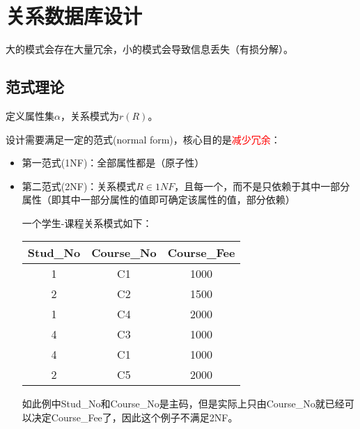 
\section{关系数据库设计} %
大的模式会存在大量冗余，小的模式会导致信息丢失（有损分解）。

\subsection{范式理论}
定义属性集$\alpha$，关系模式为$r(R)$。

设计需要满足一定的范式(normal form)，核心目的是\textcolor{red}{减少冗余}：
\begin{itemize}
	\item 第一范式(1NF)：全部属性都是（原子性）

	\item 第二范式(2NF)：关系模式$R\in 1NF$，且每一个，而不是只依赖于其中一部分属性（即其中一部分属性的值即可确定该属性的值，部分依赖）
	\begin{example}
	一个学生-课程关系模式如下：
	\begin{center}
	\begin{tabular}{|c|c|c|}\hline
		Stud\_No & Course\_No & Course\_Fee\\\hline
		1 & C1 & 1000\\
		2 & C2 & 1500\\
		1 & C4 & 2000\\
		4 & C3 & 1000\\
		4 & C1 & 1000\\
		2 & C5 & 2000\\\hline
	\end{tabular}
	\end{center}
	如此例中Stud\_No和Course\_No是主码，但是实际上只由Course\_No就已经可以决定Course\_Fee了，因此这个例子不满足2NF。
	\end{example}


\end{itemize}

